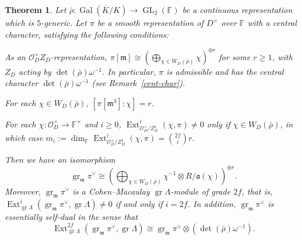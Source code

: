 \documentclass{article}
\newtheorem{theorem}[definition]{Theorem}
\numberwithin{equation}{section}
\DeclareMathOperator{\GL}{GL}
\DeclareMathOperator{\Gal}{Gal}
\DeclareMathOperator{\Ext}{Ext}
\DeclareMathOperator{\gr}{gr}
\newcommand{\fa}{\mathfrak{a}}
\newcommand{\fm}{\mathfrak{m}}
\newcommand{\bF}{\mathbb{F}}
\newcommand{\cO}{\mathcal{O}}
\begin{document}
\begin{theorem}\label{main-thm}
    Let $\bar{\rho}:\Gal(\overline{K}/K)\to\GL_2(\bF)$ be a continuous representation which is $5$-generic. 
    Let $\pi$ be a smooth representation of $D^\times$ over $\bF$ with a central character, satisfying the following conditions: 

    \begin{enumerate}[label={(\roman*)},ref={[\roman*]}]
        \item\label{condition-i}
      As an $\cO_D^\times Z_D$-representation, $\pi[\fm]\cong (\bigoplus_{\chi\in W_D(\bar{\rho})}\chi)^{\oplus r}$ for some $r\geq 1$, 
      with $Z_D$ acting by $\det(\bar{\rho})\omega^{-1}$. 
      In particular, $\pi$ is admissible and has the central character $\det(\bar{\rho})\omega^{-1}$ (see Remark~\ref{cent-char}). 
      
        \item\label{condition-ii}
        For each $\chi\in W_D(\bar{\rho})$, $[\pi[\fm^3]:\chi]=r$. 

        \item\label{condition-iii}
        For each $\chi: \cO_D^\times\to \bF^\times$ and $i\geq 0$, $\Ext^i_{\cO_D^\times/Z_D^1}(\chi,\pi)\ne 0$ only if $\chi\in W_D(\bar{\rho})$, 
        in which case $m_i:=\dim_{\bF}\Ext^i_{\cO_D^\times/Z_D^1}(\chi,\pi)=\binom{2f}{i}r$. 
      \end{enumerate}
    
    Then we have an isomorphism 
    $$\gr_\fm\pi^\vee\cong (\bigoplus_{\chi\in W_D(\bar{\rho})}\chi^{-1}\otimes R/\fa(\chi))^{\oplus r}.$$
    Moreover, $\gr_\fm\pi^\vee$ is a Cohen--Macaulay $\gr \Lambda$-module of grade $2f$, that is, 
    $\Ext_{\gr \Lambda}^i(\gr_\fm\pi^\vee,\gr \Lambda)\ne 0$ if and only if $i=2f$. 
    In addition, $\gr_\fm\pi^\vee$ is essentially self-dual in the sense that 
    $$\Ext_{\gr \Lambda}^{2f}(\gr_\fm\pi^\vee,\gr \Lambda)\cong \gr_\fm\pi^\vee\otimes(\det(\bar{\rho})\omega^{-1}).$$
\end{theorem}
\end{document}
